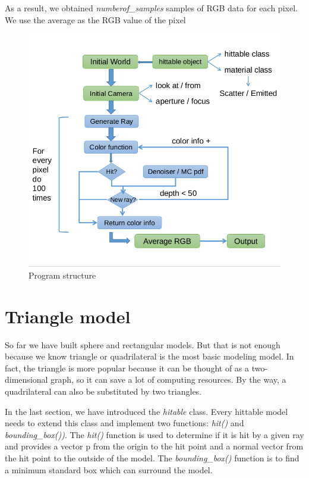 \documentclass[10pt,conference,compsoc]{IEEEtran}
\begin{document}
	As a result, we obtained \textit{numberof\_samples} samples of RGB data for each pixel. We use the average as the RGB value of the pixel
	
	\begin{figure}[ht]
		\centering
		\includegraphics[scale=0.3]{./pic/structure.png}
		\caption{Program structure }
		\label{fig:label}
	\end{figure}
	\section{Triangle model}
	So far we have built sphere and rectangular models. But that is not enough because we know triangle or quadrilateral is the most basic modeling model. In fact, the triangle is more popular because it can be thought of as a two-dimensional graph, so it can save a lot of computing resources. By the way, a quadrilateral can also be substituted by two triangles.
	
	In the last section, we have introduced the \textit{hitable} class. Every hittable model needs to extend this class and implement two functions:  \textit{hit()} and \textit{bounding\_box())}. The \textit {hit()} function is used to determine if it is hit by a given ray and provides a vector p from the origin to the hit point and a normal vector from the hit point to the outside of the model. The  \textit {bounding\_box()} function is to find a minimum standard box which can surround the model.
	
\end{document}
